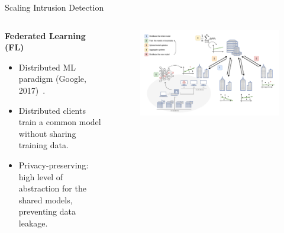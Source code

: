\begin{frame}{Scaling Intrusion Detection}

  \begin{columns}
    \begin{column}{0.4\textwidth}
      \textbf{Federated Learning (FL)}
      \small
      \begin{itemize}[<+->]
        \item Distributed ML paradigm (Google, 2017)~\autocite{mcmahan_Communicationefficientlearningdeep_2017}.
        \item Distributed clients  train a common model without sharing training data.
        \item \alert{Privacy-preserving}: high level of abstraction for the shared models, preventing data leakage.
      \end{itemize}
    \end{column}
    
    \begin{column}{0.6\textwidth}
      \begin{figure}
        \centering
        \includegraphics[width=\linewidth]{figures/intro/fl.drawio.pdf}
      \end{figure}
    \end{column}
  \end{columns}

\end{frame}


